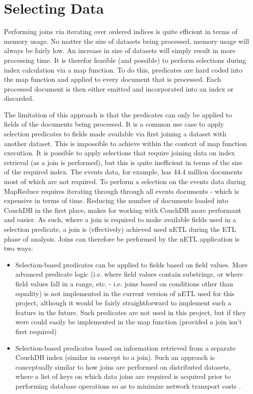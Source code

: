 \section{Selecting Data}
Performing joins via iterating over ordered indices is quite efficient in terms of memory usage. No matter the size of datasets being processed, memory usage will always be fairly low. An increase in size of datasets will simply result in more processing time. It is therefor feasible (and possible) to perform selections during index calculation via a map function. To do this, predicates are hard coded into the map function and applied to every document that is processed. Each processed document is then either emitted and incorporated into an index or discarded.

The limitation of this approach is that the predicates can only be applied to fields of the documents being processed. It is a common use case to apply selection predicates to fields made available via first joining a dataset with another dataset. This is impossible to achieve within the context of map function execution. It is possible to apply selections that require joining data on index retrieval (as a join is performed), but this is quite inefficient in terms of the size of the required index. The events data, for example, has 44.4 million documents most of which are not required. To perform a selection on the events data during MapReduce requires iterating through through all events documents - which is expensive in terms of time. Reducing the number of documents loaded into CouchDB in the first place, makes for working with CouchDB more performant and easier. As such, where a join is required to make available fields used in a selection predicate, a join is (effectively) achieved used nETL during the ETL phase of analysis. Joins can therefore be performed by the nETL application is two ways:

\begin{itemize}
  \item Selection-based predicates can be applied to fields based on field values. More advanced predicate logic (i.e. where field values contain substrings, or where field values fall in a range, etc. - i.e. joins based on conditions other than equality) is not implemented in the current version of nETL used for this project, although it would be fairly straightforward to implement such a feature in the future. Such predicates are not used in this project, but if they were could easily be implemented in the map function (provided a join isn't first required)
  \item Selection-based predicates based on information retrieved from a separate CouchDB index (similar in concept to a join). Such an approach is conceptually similar to how joins are performed on distributed datasets, where a list of keys on which data joins are required is acquired prior to performing database operations so as to minimize network transport costs \cite{sonia2018}.
\end{itemize}


